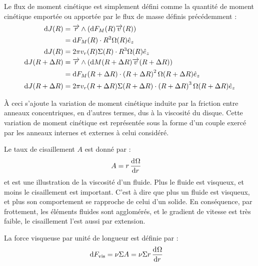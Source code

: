 Le flux de moment cinétique est simplement défini comme la quantité de moment cinétique emportée ou apportée par le flux de masse définis précédemment  :
\begin{subequations}
\begin{align}
\dif J(R) &= \vect{r} \wedge \left(\dif F_M(R) \vect{v}(R)\right)\nonumber\\
 &= \dif F_M(R) \cdot R^2\Omega(R)\hat{e}_z\nonumber\\
\dif J(R) &= 2\pi v_r(R) \Sigma(R)\cdot R^3\Omega(R)\hat{e}_z\label{eq:dJ_in}\\
\dif J(R+\Delta R) &= \vect{r} \wedge \left(\dif M(R+\Delta R) \vect{v}(R+\Delta R)\right)\nonumber\\
 &= \dif F_M(R+\Delta R) \cdot \left(R+\Delta R\right)^2\Omega(R+\Delta R)\hat{e}_z\nonumber\\
\dif J(R+\Delta R) &= 2\pi v_r(R+\Delta R) \Sigma(R+\Delta R)\cdot \left(R+\Delta R\right)^3\Omega(R+\Delta R)\hat{e}_z\label{eq:dJ_out}
\end{align}\label{eq:dJ}
\end{subequations}

\bigskip

À ceci s'ajoute la variation de moment cinétique induite par la friction entre anneaux concentriques, en d'autres termes, dus à la viscosité du disque. Cette variation de moment cinétique est représentée sous la forme d'un couple exercé par les anneaux internes et externes à celui considéré. 

Le taux de cisaillement $A$ est donné par : 
\begin{align}
A &= r \mathinner{ \dfrac{\operatorname{d \!}{^{}}\Omega}{\operatorname{d \!}{{r}^{}}} }
\end{align}
et est une illustration de la viscosité d'un fluide. Plus le fluide est visqueux, et moins le cisaillement est important. C'est à dire que plus un fluide est visqueux, et plus son comportement se rapproche de celui d'un solide. En conséquence, par frottement, les éléments fluides sont agglomérés, et le gradient de vitesse est très faible, le cisaillement l'est aussi par extension. 

La force visqueuse par unité de longueur est définie par :
\begin{align}
\operatorname{d \!} F_\text{vis} &= \nu \Sigma A = \nu \Sigma r \mathinner{ \dfrac{\operatorname{d \!}{^{}}\Omega}{\operatorname{d \!}{{r}^{}}} }
\end{align}

